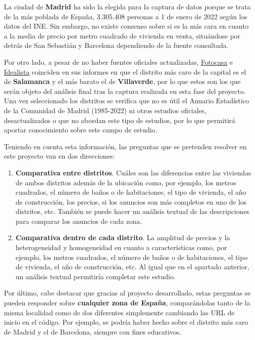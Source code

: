 \documentclass[12pt]{article}
\begin{document}
La ciudad de \textbf{Madrid} ha sido la elegida para la captura de datos porque se trata de la más poblada de España, 3.305.408 personas a 1 de enero de 2022 según los datos del INE. Sin embargo, no existe consenso sobre si es la más cara en cuanto a la media de precio por metro cuadrado de vivienda en venta, situándose por detrás de San Sebastián y Barcelona dependiendo de la fuente consultada. 

Por otro lado, a pesar de no haber fuentes oficiales actualizadas, \href{https://www.fotocasa.es/fotocasa-life/compraventa/conoce-el-precio-de-la-vivienda-en-venta-este-mes/}{Fotocasa} e \href{https://www.idealista.com/sala-de-prensa/informes-precio-vivienda/venta/madrid-comunidad/madrid-provincia/madrid/}{Idealista} coinciden en sus informes en que el distrito más caro de la capital es el de \textbf{Salamanca} y el más barato el de \textbf{Villaverde}, por lo que estos son los que serán objeto del análisis final tras la captura realizada en esta fase del proyecto. Una vez seleccionado los distritos se verifica que no es útil el Anuario Estadístico de la Comunidad de Madrid (1985-2022) ni otros estudios oficiales, desactualizados o que no abordan este tipo de estudios, por lo que permitirá aportar conocimiento sobre este campo de estudio. 

Teniendo en cuenta esta información, las preguntas que se pretenden resolver en este proyecto van en dos direcciones:
\begin{enumerate}
	\item \textbf{Comparativa entre distritos}. Cuáles son las diferencias entre las viviendas de ambos distritos además de la ubicación como, por ejemplo, los metros cuadrados, el número de baños o de habitaciones, el tipo de vivienda, el año de construcción, los precios, si los anuncios son más completos en uno de los distritos, etc. También se puede hacer un análisis textual de las descripciones para comparar los anuncios de cada zona.
	\item \textbf{Comparativa dentro de cada distrito}. La amplitud de precios y la heterogeneidad y homogeneidad en cuanto a características como, por ejemplo, los metros cuadrados, el número de baños o de habitaciones, el tipo de vivienda, el año de construcción, etc. Al igual que en el apartado anterior, un análisis textual permitiría completar este estudio. 
\end{enumerate}

Por último, cabe destacar que gracias al proyecto desarrollado, estas preguntas se pueden responder sobre \textbf{cualquier zona de España}, comparándolas tanto de la misma localidad como de dos diferentes simplemente cambiando las URL de inicio en el código. Por ejemplo, se podría haber hecho sobre el distrito más caro de Madrid y el de Barcelona, siempre con fines educativos.
\end{document}
